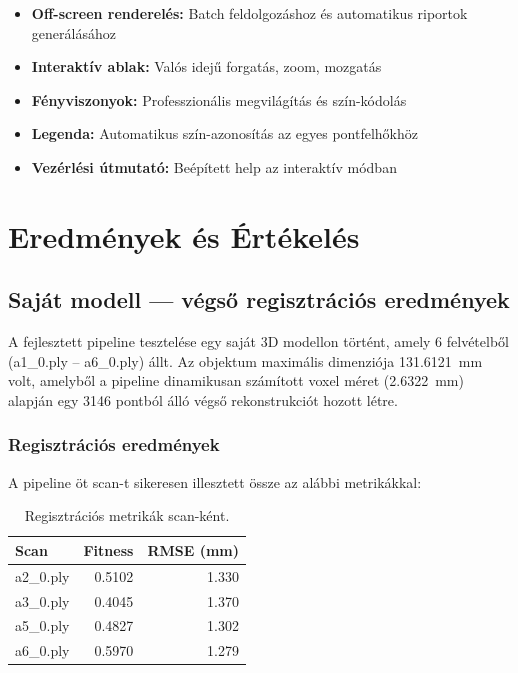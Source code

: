 \documentclass[12pt,a4paper]{article}
\begin{document}
\begin{itemize}[nosep]
    \item \textbf{Off-screen renderelés:} Batch feldolgozáshoz és automatikus riportok generálásához
    \item \textbf{Interaktív ablak:} Valós idejű forgatás, zoom, mozgatás
    \item \textbf{Fényviszonyok:} Professzionális megvilágítás és szín-kódolás
    \item \textbf{Legenda:} Automatikus szín-azonosítás az egyes pontfelhőkhöz
    \item \textbf{Vezérlési útmutató:} Beépített help az interaktív módban
\end{itemize}

\section{Eredmények és Értékelés}

\subsection{Saját modell — végső regisztrációs eredmények}

A fejlesztett pipeline tesztelése egy saját 3D modellon történt, amely 6 felvételből (a1\_0.ply -- a6\_0.ply) állt. Az objektum maximális dimenziója 131.6121~mm volt, amelyből a pipeline dinamikusan számított voxel méret (2.6322~mm) alapján egy 3146 pontból álló végső rekonstrukciót hozott létre.

\subsubsection{Regisztrációs eredmények}

A pipeline öt scan-t sikeresen illesztett össze az alábbi metrikákkal:

\begin{table}[H]
\centering
\begin{tabular}{lrr}
\toprule
\textbf{Scan} & \textbf{Fitness} & \textbf{RMSE (mm)} \\
\midrule
a2\_0.ply & 0.5102 & 1.330 \\
a3\_0.ply & 0.4045 & 1.370 \\
a5\_0.ply & 0.4827 & 1.302 \\
a6\_0.ply & 0.5970 & 1.279 \\
\bottomrule
\end{tabular}
\caption{Regisztrációs metrikák scan-ként.}
\end{table}
\end{document}
